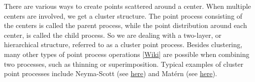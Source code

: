\documentclass[10pt]{article}
\begin{document}
There are various ways to create points scattered around a center. When multiple centers are involved, we get a cluster structure. The point process consisting of the centers is called the \textcolor{index}{parent process}, while the point distribution around each center, is called the \textcolor{index}{child process}. So we are dealing with a two-layer, or hierarchical structure, referred to as a \textcolor{index}{cluster point process}. Besides clustering, many other types of \textcolor{index}{point process operations} [\href{https://en.wikipedia.org/wiki/Point_process_operation}{Wiki}] are possible when combining two processes, such as thinning or superimposition. Typical examples of cluster point processes include 
\textcolor{index}{Neyma-Scott} (see \href{https://hpaulkeeler.com/tag/neyman-scott-point-process/}{here}) and 
\textcolor{index}{Matérn} (see \href{https://hpaulkeeler.com/simulating-a-thomas-cluster-point-process/}{here}).
\end{document}
